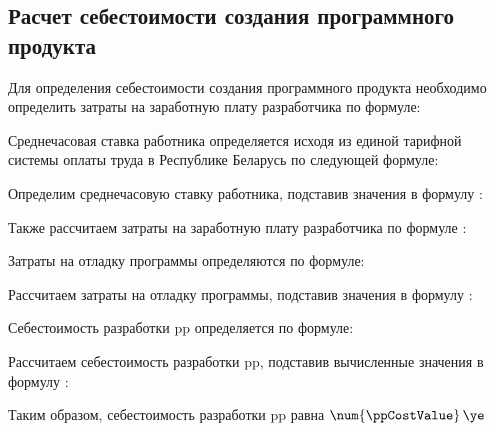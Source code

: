 \subsection{Расчет себестоимости создания программного продукта}
\label{sec:economics:pppurecost}

Для определения себестоимости создания программного продукта необходимо определить затраты на заработную плату разработчика по формуле:
\developerHourPriceEquation

Среднечасовая ставка работника определяется исходя из единой тарифной системы оплаты труда в Республике Беларусь по следующей формуле:
\developerHourRateEquation

Определим среднечасовую ставку работника, подставив значения в формулу :
\developerHourRateFormulaApplied

Также рассчитаем затраты на заработную плату разработчика по формуле :
\developerHourPriceFormulaApplied

Затраты на отладку программы определяются по формуле:
\softwareDebugCostEquation

Рассчитаем затраты на отладку программы, подставив значения в формулу :
\softwareDebugCostFormulaApplied

Себестоимость разработки \gls{pp} определяется по формуле:
\ppCostEquation

Рассчитаем себестоимость разработки \gls{pp}, подставив вычисленные значения в формулу :
\ppCostFormulaApplied

Таким образом, себестоимость разработки \gls{pp} равна \(\num{\ppCostValue} \, \ye\)
